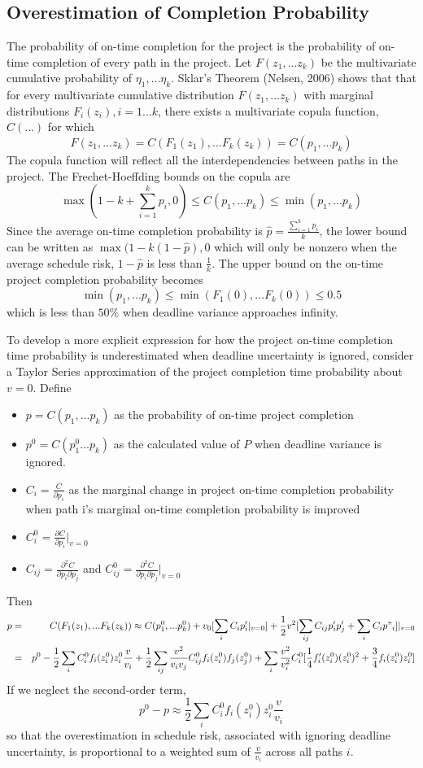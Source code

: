 \documentclass[11pt]{article}
\begin{document}
\subsection{Overestimation of Completion Probability}
The probability of on-time completion for the project is the probability of on-time completion of every path in the project. Let $F(z_1,...z_k)$ be the multivariate cumulative probability of $\eta_1,...\eta_k$.  Sklar's Theorem (Nelsen, 2006) shows that that for every multivariate cumulative distribution $F(z_1,...z_k)$ with marginal distributions
$F_i(z_i), i=1...k$, there exists a multivariate copula function, $C(...)$ for which
$$F(z_1,...z_k)= C(F_1(z_1),...F_k(z_k)) =C(p_1,...p_k)$$
The copula function will reflect all the interdependencies between paths in the project.  The Frechet-Hoeffding bounds on the copula are
$$ \max(1-k+ \sum_{i=1}^k p_i, 0) \leq C(p_1,...p_k) \leq \min(p_1,...p_k)  $$
Since the average on-time completion probability is
$\hat{p}= \frac{\sum_{i=1}^k p_i}{k}$, the lower bound can be written as $\max(1-k(1-\hat{p}),0$ which will only be nonzero when the average schedule risk, $1-\hat{p}$ is less than $\frac{1}{k}$.   The upper bound on the on-time project completion probability becomes
  $$ \min(p_1,...p_k) \leq \min(F_1(0),...F_k(0)) \leq 0. 5  $$
which is less than $50\%$ when deadline variance approaches infinity. \par To develop a more explicit expression for how the project on-time completion time probability is underestimated when deadline uncertainty is ignored, consider a Taylor Series approximation of the project completion time probability about $v=0$.  Define
\begin{itemize}
    \item $p=C(p_1,...p_k)$ as the probability of on-time project completion 
    \item $p^0=C(p^0_1...p_k)$ as the calculated value of $P$ when deadline variance is ignored.
    \item $C_i=\frac{C}{\partial p_i}$ as the marginal change in project on-time completion probability when path i's marginal on-time completion probability is improved
    \item $C_i^0=\frac{\partial C}{\partial p_i}|_{v=0}$ 
    \item $C_{ij}=\frac{\partial^2 C}{\partial p_i \partial p_j}$ and $C^0_{ij}=
    \frac{\partial^2 C}{\partial p_i \partial p_j}|_{v=0} $ 
\end{itemize}
Then  
\begin{eqnarray*}
p &=& C(F_1(z_1),...F_k(z_k)) \approx C(p^0_1,...p^0_k) + v_0 [\sum_i C_i p'_i |_{v=0}]
+  \frac{1}{2} v^2 [\sum_{ij}  C_{ij} p'_i p'_j + \sum_i C_i p"_i]|_{v=0}   \\
&=& p^0 -\frac{1}{2}  \sum_i C^0_i f_i(z^0_i) z^0_i \frac{v}{v_i}  
+ \frac{1}{2} \sum_{ij} \frac{v^2}{v_iv_j} C^0_{ij} f_i(z^0_i)f_j(z^0_j) 
+ \sum_i \frac{v^2}{v^2_i} C^0_i
[\frac{1}{4} f'_i(z^0_i)  (z^0_i)^2 + 
\frac{3}{4} f_i(z^0_i) z^0_i]
\end{eqnarray*}
If we neglect the second-order term,  $$p^0-p \approx \frac{1}{2}  \sum_i C^0_i f_i(z^0_i) z^0_i \frac{v}{v_i}  $$
so that the overestimation in schedule risk, associated with ignoring deadline uncertainty, is proportional to a weighted sum of $\frac{v}{v_i}$ across all paths $i$.
\end{document}
